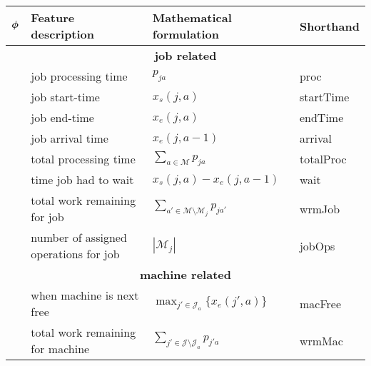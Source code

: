 \centering
\renewcommand{\arraystretch}{1.5}
\begin{tabular}{clll} %
	\toprule
	$\bm{\phi}$          & Feature description                       & Mathematical formulation                                                           & Shorthand    \\ 
	\midrule
	\multicolumn{4}{c}{\textbf{job related}}\\
	\phiproc         & job processing time                       & $p_{ja}$                                                                           & proc         \\
	\phistartTime    & job start-time                            & $x_s(j,a)$                                                                         & startTime    \\
	\phiendTime      & job end-time                              & 
	$x_e(j,a)$                                                                    
	     &
	 endTime      \\
	\phiarrivalTime  & job arrival time                          & 
	$x_e(j,a-1)$                                                                  
	     &
	 arrival      \\ 
	\phitotalProc    & total processing time                     & $\sum_{a\in \mathcal{M}}p_{ja}$                                                    & totalProc    \\
	\phiwait         & time job had to wait                      & 
	$x_s(j,a)-x_e(j,a-1) 
	$                                                             & wait         
	\\   
	\phiwrmJob       & total work remaining for job              & $\sum_{a'\in\mathcal{M}\setminus \mathcal{M}_{j}}p_{ja'}$                          & wrmJob       \\
	\phijobOps       & number of assigned operations for job     & $|\mathcal{M}_j|$                                                                  & jobOps       \\ 
	\midrule
	\multicolumn{4}{c}{\textbf{machine related}}\\
	\phimacFree      & when machine is next free                 & $\max_{j'\in 
	\mathcal{J}_a} \{x_e(j',a)\}$                                         & 
	macFree      \\
	\phiwrmMac       & total work remaining for machine          & $\sum_{j'\in\mathcal{J}\setminus \mathcal{J}_{a}}p_{j'a} $                         & wrmMac       \\

\end{tabular}
